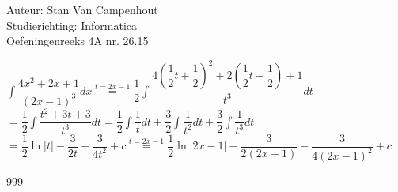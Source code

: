 \documentclass[a4paper]{article}
\begin{document}
  
\noindent \large Auteur: Stan Van Campenhout \\
\noindent \large Studierichting:  Informatica\\
\noindent \large Oefeningenreeks 4A nr. 26.15\\

\medskip

\normalsize

$ \displaystyle\int\dfrac{4x^2+2x+1}{\left(2x-1\right)^3}dx 
\stackrel{t = 2x-1}{=} \dfrac{1}{2}\displaystyle\int\dfrac{4\left(\dfrac{1}{2}t + \dfrac{1}{2}\right)^2+2\left(\dfrac{1}{2}t+\dfrac{1}{2}\right)+1}{t^3}dt $\\

$ = \dfrac{1}{2}\displaystyle\int\dfrac{t^2+3t+3}{t^3}dt 
= \dfrac{1}{2}\displaystyle\int\dfrac{1}{t}dt+\dfrac{3}{2}\displaystyle\int\dfrac{1}{t^2}dt+\dfrac{3}{2}\displaystyle\int\dfrac{1}{t^3}dt $\\

$ = \dfrac{1}{2}\ln\left|t\right|-\dfrac{3}{2t}-\dfrac{3}{4t^2} + c 
\stackrel{t = 2x-1}{=} \dfrac{1}{2}\ln\left|2x-1\right|-\dfrac{3}{2\left(2x-1\right)}-\dfrac{3}{4\left(2x-1\right)^2} + c $\\

\begin{thebibliography}{999}
\end{thebibliography}
\end{document}
